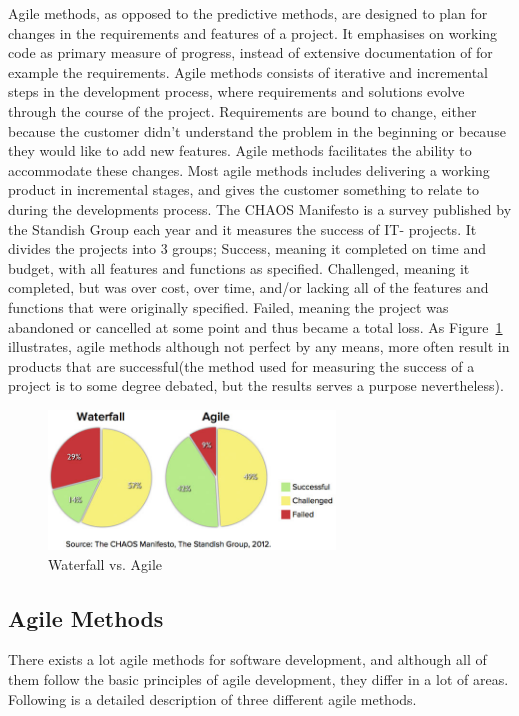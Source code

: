Agile methods, as opposed to the predictive methods, are designed to plan for changes in the requirements and features of a project. It emphasises on working code as primary measure of progress, instead of extensive documentation of for example the requirements. Agile methods consists of iterative and incremental steps in the development process, where requirements and solutions evolve through the course of the project. Requirements are bound to change, either because the customer didn't understand the problem in the beginning or because they would like to add new features. Agile methods facilitates the ability to accommodate these changes. Most agile methods includes delivering a working product in incremental stages, and gives the customer something to relate to during the developments process. The CHAOS Manifesto is a survey published by the Standish Group each year and it measures the success of IT- projects. It divides the projects into 3 groups; Success, meaning it completed on time and budget, with all features and functions as specified. Challenged, meaning it  completed, but was over cost, over time, and/or lacking all of the features and functions that were originally specified. Failed, meaning the project was abandoned or cancelled at some point and thus became a total loss. As Figure~\ref{figure:devchart} illustrates, agile methods although not perfect by any means, more often result in products that are successful(the method used for measuring the success of a project is to some degree debated, but the results serves a purpose nevertheless).

\begin{figure}
\centering
\includegraphics[width=3in]{image/Agile-Waterfall.jpeg}
\caption{Waterfall vs. Agile}
\label{figure:devchart}
\end{figure}

\subsection{Agile Methods}
There exists a lot agile methods for software development, and although all of them follow the basic principles of agile development, they differ in a lot of areas. Following is a detailed description of three different agile methods.

